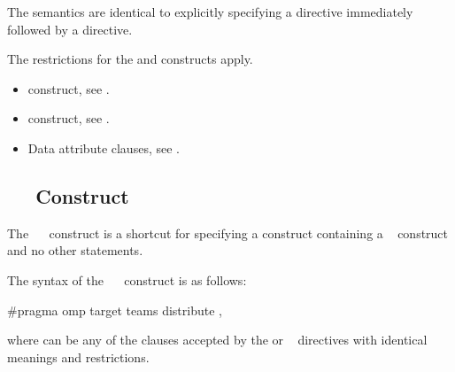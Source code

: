 \descr

The semantics are identical to explicitly specifying a  directive
immediately followed by a  directive.

\restrictions
The restrictions for the  and  constructs apply.

\crossreferences
\begin{itemize}
\item {} construct, see .

\item {} construct, see .

\item Data attribute clauses, see
.
\end{itemize}



\subsection{~~ Construct}
\label{subsec:target teams distribute construct}
\summary
The ~~ construct is a shortcut for 
specifying a  construct containing a ~ 
construct and no other statements.

\syntax
\begin{ccppspecific}
The syntax of the ~~ construct is as follows:

\begin{ompcPragma}
#pragma omp target teams distribute \plc{[clause[ [},\plc{] clause] ... ] new-line}
\end{ompcPragma}

where  can be any of the clauses accepted by the  or 
~ directives with identical meanings and restrictions.
\end{ccppspecific}

